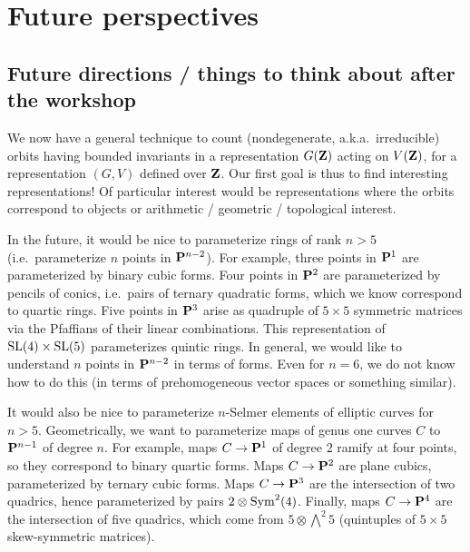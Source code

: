 
\section{Future perspectives}





\subsection{Future directions / things to think about after the workshop}

We now have a general technique to count (nondegenerate, a.k.a.~irreducible) 
orbits having bounded invariants in a representation $G(\mathbf{Z})$ acting on 
$V(\mathbf{Z})$, for a representation $(G,V)$ defined over $\mathbf{Z}$. Our first goal 
is thus to find interesting representations! Of particular interest would be 
representations where the orbits correspond to objects or arithmetic / 
geometric / topological interest. 

In the future, it would be nice to parameterize rings of rank $n>5$ 
(i.e.~parameterize $n$ points in $\mathbf{P}^{n-2}$). For example, three points in 
$\mathbf{P}^1$ are parameterized by binary cubic forms. Four points in 
$\mathbf{P}^2$ are parameterized by pencils of conics, i.e.~pairs of ternary 
quadratic forms, which we know correspond to quartic rings. 
Five points in $\mathbf{P}^3$ arise as quadruple of $5\times 5$ symmetric matrices via 
the Pfaffians of their linear combinations. This representation of 
$\operatorname{SL}(4)\times \operatorname{SL}(5)$ parameterizes quintic rings. 
In general, we would like to understand $n$ points in $\mathbf{P}^{n-2}$ in terms of 
forms. Even for $n=6$, we do not know how to do this (in terms of 
prehomogeneous vector spaces or something similar). 

It would also be nice to parameterize $n$-Selmer elements of elliptic curves 
for $n>5$. Geometrically, we want to parameterize maps of genus one curves $C$ 
to $\mathbf{P}^{n-1}$ of degree $n$. For example, maps $C\to \mathbf{P}^1$ of degree $2$ 
ramify at four points, so they correspond to binary quartic forms. Maps 
$C\to \mathbf{P}^2$ are plane cubics, parameterized by ternary cubic forms. Maps 
$C\to \mathbf{P}^3$ are the intersection of two quadrics, hence parameterized by 
pairs $2\otimes \operatorname{Sym}^2(4)$. Finally, maps $C\to \mathbf{P}^4$ are the 
intersection of five quadrics, which come from $5\otimes \bigwedge^2 5$ 
(quintuples of $5\times 5$ skew-symmetric matrices). 

